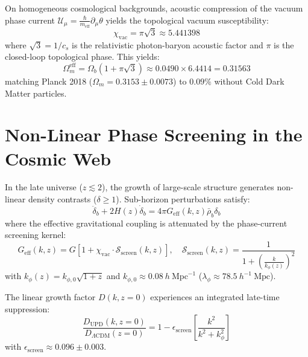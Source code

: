 \documentclass[11pt,a4paper]{article}
\begin{document}
On homogeneous cosmological backgrounds, acoustic compression of the vacuum phase current $\mathcal{U}_\mu = \frac{\hbar}{m_{\mathrm{eff}}} \partial_\mu \theta$ yields the topological vacuum susceptibility:
\begin{equation}
\chi_{\mathrm{vac}} = \pi \sqrt{3} \approx 5.441398
\end{equation}
where $\sqrt{3} = 1/c_s$ is the relativistic photon-baryon acoustic factor and $\pi$ is the closed-loop topological phase. This yields:
\begin{equation}
\Omega_m^{\mathrm{eff}} = \Omega_b (1 + \pi\sqrt{3}) \approx 0.0490 \times 6.4414 = 0.31563
\end{equation}
matching Planck 2018 ($\Omega_m = 0.3153 \pm 0.0073$) to $0.09\%$ without Cold Dark Matter particles.

\section{Non-Linear Phase Screening in the Cosmic Web}
In the late universe ($z \lesssim 2$), the growth of large-scale structure generates non-linear density contrasts ($\delta \ge 1$). Sub-horizon perturbations satisfy:
\begin{equation}
\ddot{\delta}_b + 2 H(z) \dot{\delta}_b = 4\pi G_{\mathrm{eff}}(k, z) \bar{\rho}_b \delta_b
\end{equation}
where the effective gravitational coupling is attenuated by the phase-current screening kernel:
\begin{equation}
G_{\mathrm{eff}}(k, z) = G \left[ 1 + \chi_{\mathrm{vac}} \cdot \mathcal{S}_{\mathrm{screen}}(k, z) \right], \quad \mathcal{S}_{\mathrm{screen}}(k, z) = \frac{1}{1 + \left(\frac{k}{k_\phi(z)}\right)^2}
\end{equation}
with $k_\phi(z) = k_{\phi, 0} \sqrt{1 + z}$ and $k_{\phi, 0} \approx 0.08\ h\ \mathrm{Mpc}^{-1}$ ($\lambda_\phi \approx 78.5\ h^{-1}\ \mathrm{Mpc}$).

The linear growth factor $D(k, z=0)$ experiences an integrated late-time suppression:
\begin{equation}
\frac{D_{\mathrm{UPD}}(k, z=0)}{D_{\Lambda\mathrm{CDM}}(z=0)} = 1 - \epsilon_{\mathrm{screen}} \left[ \frac{k^2}{k^2 + k_\phi^2} \right]
\end{equation}
with $\epsilon_{\mathrm{screen}} \approx 0.096 \pm 0.003$.
\end{document}
